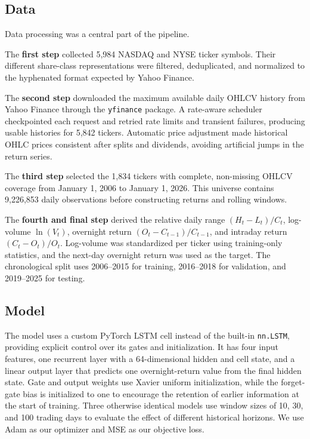 \documentclass[12pt,a4paper]{article}
\begin{document}
\subsection{Data}
Data processing was a central part of the pipeline.

The \textbf{first step} collected 5,984 NASDAQ and NYSE ticker symbols. Their
different share-class representations were filtered, deduplicated, and
normalized to the hyphenated format expected by Yahoo Finance.

The \textbf{second step} downloaded the maximum available daily OHLCV history
from Yahoo Finance through the \texttt{yfinance} package. A rate-aware scheduler checkpointed each request and retried
rate limits and transient failures, producing usable histories for 5,842
tickers. Automatic price adjustment made historical OHLC prices consistent
after splits and dividends, avoiding artificial jumps in the return series.

The \textbf{third step} selected the 1,834 tickers with complete, non-missing
OHLCV coverage from January 1, 2006 to January 1, 2026. This universe contains
9,226,853 daily observations before constructing returns and rolling windows.

The \textbf{fourth and final step} derived the relative daily range
$(H_t-L_t)/C_t$, log-volume $\ln(V_t)$, overnight return
$(O_t-C_{t-1})/C_{t-1}$, and intraday return $(C_t-O_t)/O_t$. Log-volume was
standardized per ticker using training-only statistics, and the next-day
overnight return was used as the target. The chronological split uses
2006--2015 for training, 2016--2018 for validation, and 2019--2025 for testing.

\subsection{Model}
The model uses a custom PyTorch LSTM cell instead of the built-in
\texttt{nn.LSTM}, providing explicit control over its gates and initialization.
It has four input features, one recurrent layer with a 64-dimensional hidden
and cell state, and a linear output layer that predicts one overnight-return
value from the final hidden state. Gate and output weights use Xavier uniform
initialization, while the forget-gate bias is initialized to one to encourage
the retention of earlier information at the start of training. Three otherwise
identical models use window sizes of 10, 30, and 100 trading days to evaluate
the effect of different historical horizons. We use Adam as our optimizer and MSE as our objective loss.
\end{document}
